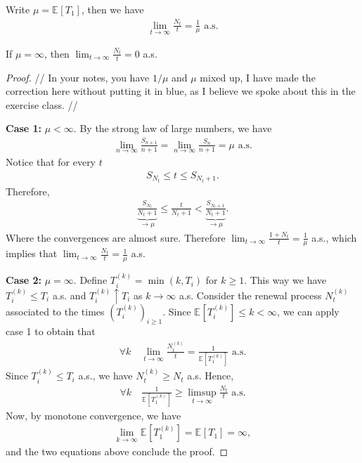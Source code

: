 \begin{theorem}
Write $\mu = \mathbb{E}_{} \left[ T_1 \right] $, then we have 
\begin{align}
	\lim_{t \to \infty} \frac{N_t}{t} = \frac{1}{\mu} \textrm{ a.s.}
\end{align}
\end{theorem}
\begin{rmk}[]
	If $\mu = \infty $, then $\lim_{t\to \infty } \frac{N_t}{t} = 0$ a.s.
\end{rmk}
\begin{proof}
	{\color{blue} // In your notes, you have $1/\mu $ and $\mu $ mixed up, I have made the correction here without putting it in blue, as I believe we spoke about this in the exercise class. //}

\textbf{Case 1:} $\mu < \infty $.
By the strong law of large numbers, we have 
\begin{align}
	\lim_{n \to \infty} \frac{S_{n+1}}{n+1} = \lim_{n \to \infty }\frac{S_n}{n+1} = \mu \textrm{ a.s.}
\end{align}
Notice that for every $t$ 
\begin{align}
	S_{N_t} \leq t \leq S_{N_{t}+1}.
\end{align}
Therefore,
\begin{align}
\underbrace{\frac{S_{N_t}}{N_t + 1}}_{\to \mu}
	\leq \frac{t}{N_t + 1} 
< \underbrace{\frac{S_{N_t + 1}}{N_t + 1}}_{\to \mu }.
\end{align}
Where the convergences are almost sure. Therefore $\lim_{t\to \infty } \frac{1 + N_t}{t} = \frac{1}{\mu }$ a.s., which implies that $\lim_{t \to \infty } \frac{N_t}{t} = \frac{1}{\mu} $ a.s.

\textbf{Case 2:} $\mu = \infty $.
Define $T_{i}^{(k)} = \min(k, T_i)$ for $k\geq 1$. This way we have $T_i^{(k)} \leq T_i$ a.s. and $T_i^{(k)} \uparrow T_i$ as $k \to \infty $ a.s. Consider the renewal process $N_t^{(k)}$ associated to the times $(T_i^{(k)})_{i\geq 1}$. Since $\mathbb{E}_{} \left[ T_i^{(k)} \right] \leq k < \infty$, we can apply case 1 to obtain that
\begin{align}
	\forall k \quad \lim_{t\to \infty }\frac{N_t^{(k)}}{t} = \frac{1}{\mathbb{E}_{} \left[ T_1^{(k)} \right] } \textrm{ a.s.}
\end{align}
Since $T_{i}^{(k)}\leq T_i$ a.s., we have $N_{t}^{(k)}\geq N_t$ a.s. Hence,
\begin{align}
	\forall k \quad \frac{1}{\mathbb{E}_{} \left[ T_1^{(k)} \right] } \geq \limsup_{t\to\infty} \frac{N_t}{t} \textrm{ a.s.}
\end{align}
Now, by monotone convergence, we have 
\begin{align}
	\lim_{k\to \infty } \mathbb{E}_{} \left[ T_1^{(k)} \right]  = \mathbb{E}_{} \left[ T_1 \right] = \infty,
\end{align}
and the two equations above conclude the proof.
\end{proof}

